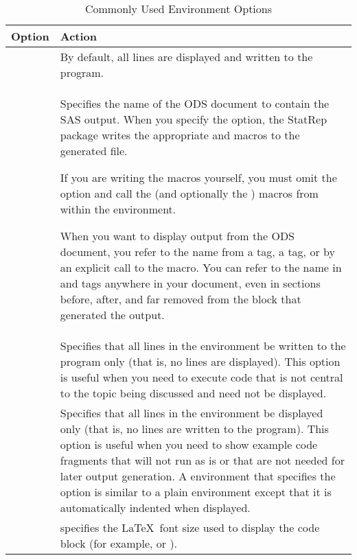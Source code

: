 \documentclass[article,oneside]{memoir}
\newcommand*{\StatRep}{\textsf{StatRep}\xspace}
\begin{document}
\begin{table}[H]
\caption{Commonly Used  Environment Options}\label{scopt}
\begin{tabular}{lP{3.75in}}
\hline
\textbf{Option}  &  \textbf{Action} \\
\hline
& By default, all lines are displayed and written to the program. \\[0.5\baselineskip]
      &
         Specifies the name of the ODS document to contain the SAS output.
         When you specify the  option, the \StatRep package writes the
         appropriate  and  macros to the generated file.

         If you are writing the macros yourself, you must omit the  option
         and call the  (and optionally the ) macros from within the
          environment.

         When you want to display output from the ODS document, you refer
         to the  name from a  tag, a  tag, or by
         an explicit call to the  macro. You can refer to the name in
          and  tags
         anywhere in your document, even in sections before, after, and far removed from
         the  block that generated the output.
\\[0.5\baselineskip]

     & Specifies that  all lines in the environment
                     be written to the program only
                (that is, no lines are displayed). This option is useful when you need
                to execute code that is not central to the topic being discussed and need not
                be displayed.
\\[0.5\baselineskip]
     &
                  Specifies that all lines in the environment
                  be displayed only (that is, no lines are written to the program).
                This option is
                useful when you need to show example code
                fragments that will not run as is or that are not needed
                for later output generation. A  environment that specifies
                the  option is similar to a plain  environment except
                that it is automatically indented when displayed.
\\[0.5\baselineskip]
   &
        specifies the \LaTeX\ font size used to display the
       code block (for example,  or ).
\\
\hline
\end{tabular}
\end{table}
\end{document}
